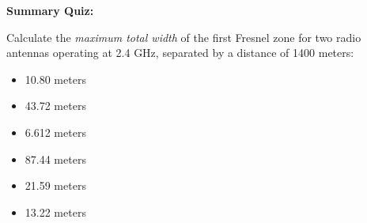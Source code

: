 \vfil \eject

\noindent
{\bf Summary Quiz:}

Calculate the {\it maximum total width} of the first Fresnel zone for two radio antennas operating at 2.4 GHz, separated by a distance of 1400 meters:

\begin{itemize}
\item{} 10.80 meters
\vskip 5pt 
\item{} 43.72 meters
\vskip 5pt 
\item{} 6.612 meters
\vskip 5pt 
\item{} 87.44 meters
\vskip 5pt 
\item{} 21.59 meters
\vskip 5pt 
\item{} 13.22 meters
\end{itemize}





